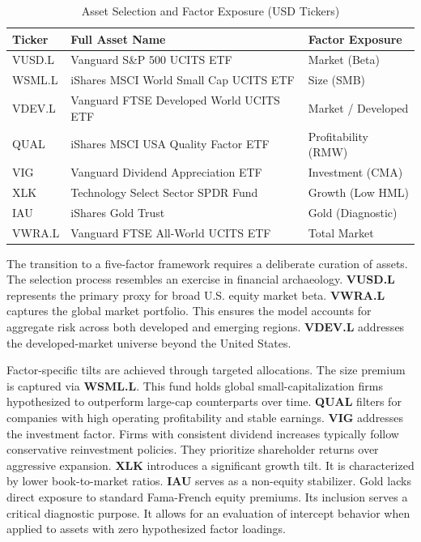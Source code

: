 \documentclass[12pt]{article}
\begin{document}
\begin{table}[htbp]
    \centering
    \caption{Asset Selection and Factor Exposure (USD Tickers)}
    \label{tab:asset_selection}
    \begin{tabularx}{\textwidth}{llX}
        \toprule
        \textbf{Ticker} & \textbf{Full Asset Name} & \textbf{Factor Exposure} \\
        \midrule
        VUSD.L & Vanguard S\&P 500 UCITS ETF & Market (Beta) \\
        WSML.L & iShares MSCI World Small Cap UCITS ETF & Size (SMB) \\
        VDEV.L & Vanguard FTSE Developed World UCITS ETF & Market / Developed \\
        QUAL   & iShares MSCI USA Quality Factor ETF & Profitability (RMW) \\
        VIG    & Vanguard Dividend Appreciation ETF & Investment (CMA) \\
        XLK    & Technology Select Sector SPDR Fund & Growth (Low HML) \\
        IAU    & iShares Gold Trust & Gold (Diagnostic) \\
        VWRA.L & Vanguard FTSE All-World UCITS ETF & Total Market \\
        \bottomrule
    \end{tabularx}
\end{table}

The transition to a five-factor framework requires a deliberate curation of assets. The selection process resembles an exercise in financial archaeology. \textbf{VUSD.L} represents the primary proxy for broad U.S. equity market beta. \textbf{VWRA.L} captures the global market portfolio. This ensures the model accounts for aggregate risk across both developed and emerging regions. \textbf{VDEV.L} addresses the developed-market universe beyond the United States. 

Factor-specific tilts are achieved through targeted allocations. The size premium is captured via \textbf{WSML.L}. This fund holds global small-capitalization firms hypothesized to outperform large-cap counterparts over time. \textbf{QUAL} filters for companies with high operating profitability and stable earnings. \textbf{VIG} addresses the investment factor. Firms with consistent dividend increases typically follow conservative reinvestment policies. They prioritize shareholder returns over aggressive expansion. \textbf{XLK} introduces a significant growth tilt. It is characterized by lower book-to-market ratios. \textbf{IAU} serves as a non-equity stabilizer. Gold lacks direct exposure to standard Fama-French equity premiums. Its inclusion serves a critical diagnostic purpose. It allows for an evaluation of intercept behavior when applied to assets with zero hypothesized factor loadings.
\end{document}
